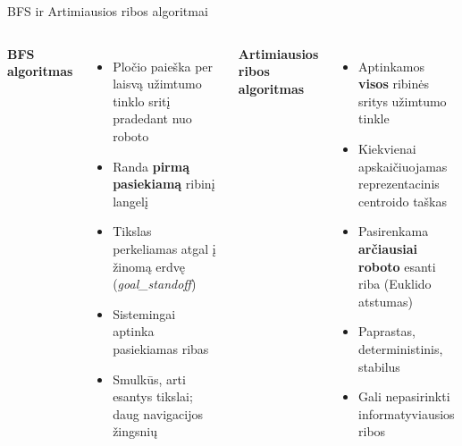 \documentclass[12pt]{beamer}
\begin{document}
\begin{frame}{BFS ir Artimiausios ribos algoritmai}
    \begin{columns}[onlytextwidth]
        \textbf{BFS algoritmas}
        \begin{itemize}
            \item Pločio paieška per laisvą užimtumo tinklo sritį pradedant nuo roboto
            \item Randa \textbf{pirmą pasiekiamą} ribinį langelį
            \item Tikslas perkeliamas atgal į žinomą erdvę (\textit{goal\_standoff})
            \item[+] Sistemingai aptinka pasiekiamas ribas
            \item[--] Smulkūs, arti esantys tikslai; daug navigacijos žingsnių
        \end{itemize}

        \textbf{Artimiausios ribos algoritmas}
        \begin{itemize}
            \item Aptinkamos \textbf{visos} ribinės sritys užimtumo tinkle
            \item Kiekvienai apskaičiuojamas reprezentacinis centroido taškas
            \item Pasirenkama \textbf{arčiausiai roboto} esanti riba (Euklido atstumas)
            \item[+] Paprastas, deterministinis, stabilus
            \item[--] Gali nepasirinkti informatyviausios ribos
        \end{itemize}
    \end{columns}
\end{frame}
\end{document}
